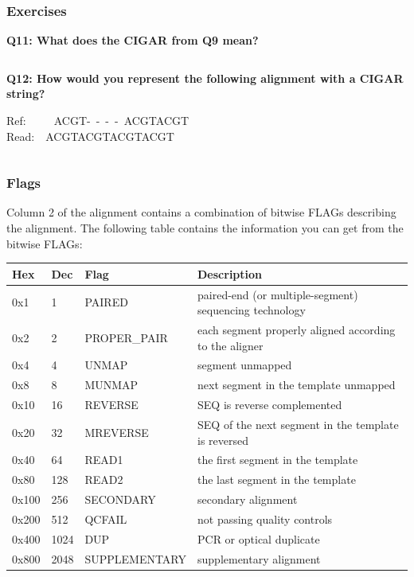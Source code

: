 \documentclass[11pt]{article}
\makeatletter
\newcommand{\boxspacing}{\kern\kvtcb@left@rule\kern\kvtcb@boxsep}
\newcommand{\prompt}[4]{
        \ttfamily\llap{{\color{#2}\LARGE\faKeyboardO\hspace{3pt}#4}}\vspace{-\baselineskip}
    }
\makeatother
\begin{document}
\hypertarget{exercises}{%
\subsubsection{Exercises}\label{exercises}}

\textbf{Q11: What does the CIGAR from Q9 mean?}

    \begin{tcolorbox}[breakable, size=fbox, boxrule=1pt, pad at break*=1mm,colback=cellbackground, colframe=cellborder]
\prompt{In}{incolor}{ }{\boxspacing}
\begin{Verbatim}[commandchars=\\\{\}]

\end{Verbatim}
\end{tcolorbox}

    \textbf{Q12: How would you represent the following alignment with a
CIGAR string?}

Ref:~~~~~ACGT-~-~-~-~ACGTACGT\\
Read:~~ACGTACGTACGTACGT

    \begin{tcolorbox}[breakable, size=fbox, boxrule=1pt, pad at break*=1mm,colback=cellbackground, colframe=cellborder]
\prompt{In}{incolor}{ }{\boxspacing}
\begin{Verbatim}[commandchars=\\\{\}]

\end{Verbatim}
\end{tcolorbox}

    \hypertarget{flags}{%
\subsubsection{Flags}\label{flags}}

Column 2 of the alignment contains a combination of bitwise FLAGs
describing the alignment. The following table contains the information
you can get from the bitwise FLAGs:

\begin{longtable}[]{@{}llll@{}}
\hline
Hex & Dec & Flag & Description\tabularnewline
\hline
\endhead
0x1 & 1 & PAIRED & paired-end (or multiple-segment) sequencing
technology\tabularnewline
0x2 & 2 & PROPER\_PAIR & each segment properly aligned according to the
aligner\tabularnewline
0x4 & 4 & UNMAP & segment unmapped\tabularnewline
0x8 & 8 & MUNMAP & next segment in the template unmapped\tabularnewline
0x10 & 16 & REVERSE & SEQ is reverse complemented\tabularnewline
0x20 & 32 & MREVERSE & SEQ of the next segment in the template is
reversed\tabularnewline
0x40 & 64 & READ1 & the first segment in the template\tabularnewline
0x80 & 128 & READ2 & the last segment in the template\tabularnewline
0x100 & 256 & SECONDARY & secondary alignment\tabularnewline
0x200 & 512 & QCFAIL & not passing quality controls\tabularnewline
0x400 & 1024 & DUP & PCR or optical duplicate\tabularnewline
0x800 & 2048 & SUPPLEMENTARY & supplementary alignment\tabularnewline
\hline
\end{longtable}
\end{document}
